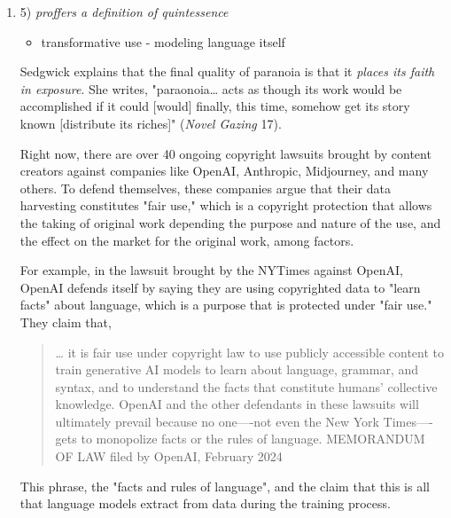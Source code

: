 \documentclass[11pt]{article}
\begin{document}
\begin{enumerate}
This unintuitive reality, that more data results in less diverse
viewpoints, which in turn results in more biased models, has a
specific implication on language and language meaning. It means that
the convergence of language meaning is a function of scale. The larger
the scale of the dataset perhaps creates a situation where meaning
whittles to a single value, like Black -> criminal.

\item 5) \emph{proffers a definition of quintessence}
\label{sec:orgda88459}
\begin{itemize}
\item transformative use - modeling language itself
\end{itemize}

Sedgwick explains that the final quality of paranoia is that it
\emph{places its faith in exposure}. She writes, "paraonoia\ldots{} acts as
though its work would be accomplished if it could [would] finally,
this time, somehow get its story known [distribute its riches]"
(\emph{Novel Gazing} 17).

Right now, there are over 40 ongoing copyright lawsuits brought by
content creators against companies like OpenAI, Anthropic, Midjourney,
and many others. To defend themselves, these companies argue that
their data harvesting constitutes "fair use," which is a copyright
protection that allows the taking of original work depending the
purpose and nature of the use, and the effect on the market for the
original work, among factors.

For example, in the lawsuit brought by the NYTimes against OpenAI,
OpenAI defends itself by saying they are using copyrighted data to
"learn facts" about language, which is a purpose that is protected
under "fair use." They claim that,
\begin{quote}
\ldots{} it is fair use under copyright law to use publicly accessible
content to train generative AI models to learn about language,
grammar, and syntax, and to understand the facts that constitute
humans’ collective knowledge. OpenAI and the other defendants in these
lawsuits will ultimately prevail because no one—-not even the New York
Times—-gets to monopolize facts or the rules of language. MEMORANDUM
OF LAW filed by OpenAI, February 2024
\end{quote}
This phrase, the "facts and rules of language", and the claim that
this is all that language models extract from data during the training
process.


\end{enumerate}
\end{document}
